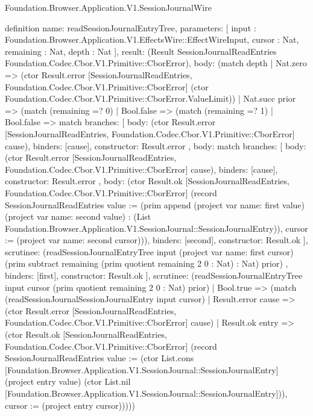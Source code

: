 \begin{lexlean}{Foundation.Browser.Application.V1.SessionJournalWire}
\begin{semanticmodule}
definition{
  name: readSessionJournalEntryTree,
  parameters: [
    input : Foundation.Browser.Application.V1.EffectsWire::EffectWireInput,
    cursor : Nat,
    remaining : Nat,
    depth : Nat
  ],
  result: (Result SessionJournalReadEntries Foundation.Codec.Cbor.V1.Primitive::CborError),
  body: (match depth
    | Nat.zero => (ctor Result.error [SessionJournalReadEntries, Foundation.Codec.Cbor.V1.Primitive::CborError] (ctor Foundation.Codec.Cbor.V1.Primitive::CborError.ValueLimit))
    | Nat.succ prior => (match (remaining =? 0)
      | Bool.false => (match (remaining =? 1)
        | Bool.false => match{
          branches: [
            {
              body: (ctor Result.error [SessionJournalReadEntries, Foundation.Codec.Cbor.V1.Primitive::CborError] cause),
              binders: [cause],
              constructor: Result.error
            },
            {
              body: match{
                branches: [
                  {
                    body: (ctor Result.error [SessionJournalReadEntries, Foundation.Codec.Cbor.V1.Primitive::CborError] cause),
                    binders: [cause],
                    constructor: Result.error
                  },
                  {
                    body: (ctor Result.ok [SessionJournalReadEntries, Foundation.Codec.Cbor.V1.Primitive::CborError] (record SessionJournalReadEntries {value := (prim append (project var{
                      name: first
                    } value) (project var{
                      name: second
                    } value) : (List Foundation.Browser.Application.V1.SessionJournal::SessionJournalEntry)), cursor := (project var{
                      name: second
                    } cursor)})),
                    binders: [second],
                    constructor: Result.ok
                  }
                ],
                scrutinee: (readSessionJournalEntryTree input (project var{
                  name: first
                } cursor) (prim subtract remaining (prim quotient remaining 2 0 : Nat) : Nat) prior)
              },
              binders: [first],
              constructor: Result.ok
            }
          ],
          scrutinee: (readSessionJournalEntryTree input cursor (prim quotient remaining 2 0 : Nat) prior)
        }
        | Bool.true => (match (readSessionJournalSessionJournalEntry input cursor)
          | Result.error cause => (ctor Result.error [SessionJournalReadEntries, Foundation.Codec.Cbor.V1.Primitive::CborError] cause)
          | Result.ok entry => (ctor Result.ok [SessionJournalReadEntries, Foundation.Codec.Cbor.V1.Primitive::CborError] (record SessionJournalReadEntries {value := (ctor List.cons [Foundation.Browser.Application.V1.SessionJournal::SessionJournalEntry] (project entry value) (ctor List.nil [Foundation.Browser.Application.V1.SessionJournal::SessionJournalEntry])), cursor := (project entry cursor)}))))
}
\end{semanticmodule}
\end{lexlean}
